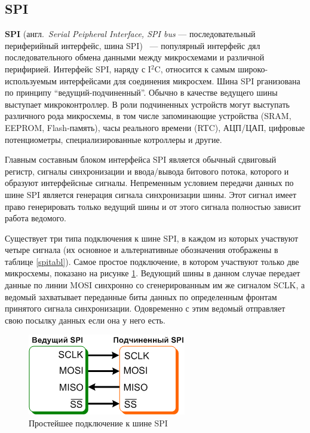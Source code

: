 \fi

\newpage

\subsection{SPI}

\textbf{SPI} (англ.~\textit{Serial Peipheral Interface, SPI bus} --- последовательный периферийный интерфейс, шина SPI) ~--- популярный интерфейс дял последовательного обмена данными между микросхемами и различной перифирией\cite{spiinterface}. Интерфейс SPI, наряду с I$^2$C, относится к самым широко-используемым интерфейсами для соединения микросхем. Шина SPI рганизована по принципу ``ведущий-подчиненный''. Обычно в качестве ведущего шины выступает микроконтроллер. В роли подчиненных устройств могут выступать различного рода микросхемы, в том числе запоминающие устройства (SRAM, EEPROM, Flash-память), часы реального времени (RTC), АЦП/ЦАП, цифровые потенциометры, специализированные котроллеры и другие.

Главным составным блоком интерфейса SPI является обычный сдвиговый регистр, сигналы синхронизации и ввода/вывода битового потока, которого и образуют интерфейсные сигналы. Непременным условием передачи данных по шине SPI является генерация сигнала синхронизации шины. Этот сигнал имеет право генерировать только ведущий шины и от этого сигнала полностью зависит работа ведомого.

Существует три типа подключения к шине SPI, в каждом из которых участвуют четыре сигнала (их основное и альтернативные обозначения отображены в таблице \ref{spitabl}). Самое простое подключение, в котором участвуют только две микросхемы, показано на рисунке \ref{fig:spiconnection}. Ведующий шины в данном случае передает данные по линии MOSI синхронно со сгенерированным им же сигналом SCLK, а ведомый захватывает переданные биты данных по определенным фронтам принятого сигнала синхронизации. Одовременно с этим ведомый отправляет свою посылку данных если она у него есть. 

\begin{figure}[H]
	\centering
		\includegraphics[scale=1.0]{img/spiconnect.png}
	\caption{Простейшее подключение к шине SPI \label{fig:spiconnection}}
\end{figure}

